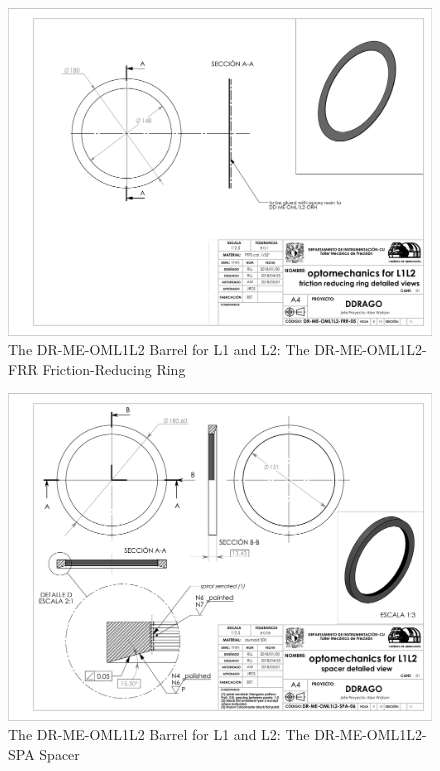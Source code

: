 \documentclass{article}
\begin{document}
\begin{figure}
\begin{center}
\includegraphics[height=\linewidth,angle=90]{figures/DR-ME-OML1L2-FRR-05}
\end{center}
\caption{The DR-ME-OML1L2 Barrel for L1 and L2: The DR-ME-OML1L2-FRR Friction-Reducing Ring}
\label{figure:rosalia-oml1l2-frr}
\end{figure}

\begin{figure}
\begin{center}
\includegraphics[height=\linewidth,angle=90]{figures/DR-ME-OML1L2-SPA-06.PDF}
\end{center}
\caption{The DR-ME-OML1L2 Barrel for L1 and L2: The DR-ME-OML1L2-SPA Spacer}
\label{figure:rosalia-oml1l2-spa}
\end{figure}
\end{document}
